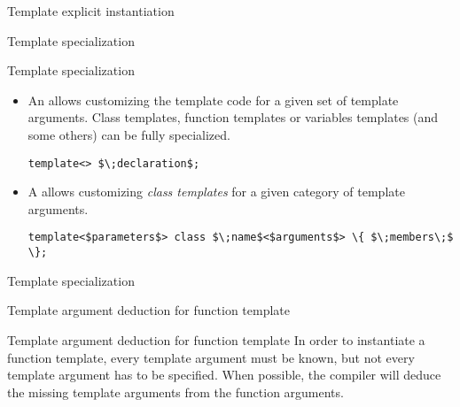 \begin{frame}{Template explicit instantiation}{}
  \begin{example}
  \end{example}
\end{frame}

\begin{frame}{Template specialization}{}
  \begin{block}{Template specialization}
    \begin{itemize}
    \item
      An  allows customizing the template code for a given set of template arguments. Class templates, function templates or variables templates (and some others) can be fully specialized.
      \begin{center}
        \lstinline[mathescape]!template<> $\;declaration$;!
      \end{center}
    \item
      A  allows customizing \emph{class templates} for a given category of template arguments.
      \begin{center}
        \lstinline[mathescape]!template<$parameters$> class $\;name$<$arguments$> \{ $\;members\;$ \};!
      \end{center}
    \end{itemize}
  \end{block}
\end{frame}

\begin{frame}{Template specialization}{}
  \begin{example}
  \end{example}
\end{frame}


\begin{frame}{Template argument deduction for function template}{}
  \begin{block}{Template argument deduction for function template}
    In order to instantiate a function template, every template argument must be known, but not every template argument has to be specified. When possible, the compiler will deduce the missing template arguments from the function arguments.
  \end{block}

  \begin{example}
  \end{example}
\end{frame}

